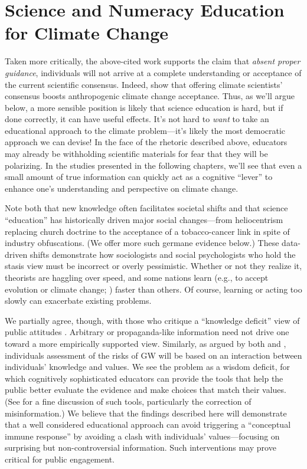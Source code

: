 \section{Science and Numeracy Education for Climate Change}
\label{sec:science-ed}

Taken more critically, the above-cited work supports the claim that \emph{absent
proper guidance}, individuals will not arrive at a complete understanding or
acceptance of the current scientific consensus.  Indeed,
\textcite{lewandowsky_pivotal_2013} show that offering climate scientists'
consensus boosts anthropogenic climate change acceptance.  Thus, as we'll argue
below, a more sensible position is likely that science education is hard, but if
done correctly, it can have useful effects.  It's not hard to \emph{want} to
take an educational approach to the climate problem---it's likely the most
democratic approach we can devise! In the face of the rhetoric described above,
educators may already be withholding scientific materials for fear that they will
be polarizing. In the studies presented in the following chapters, we'll see
that even a small amount of true information can quickly act as a cognitive
``lever'' to enhance one's understanding and perspective on climate change.

Note both that new knowledge often facilitates societal shifts and that science
``education'' has historically driven major social changes—from heliocentrism
replacing church doctrine to the acceptance of a tobacco-cancer link in spite of
industry obfuscations. (We offer more such germane evidence below.) These
data-driven shifts demonstrate how sociologists and social psychologists who
hold the stasis view must be incorrect or overly pessimistic. Whether or not
they realize it, theorists are haggling over speed, and some nations learn
(e.g., to accept evolution or climate change; ) faster than others.
Of course, learning or acting too slowly can exacerbate existing problems.

We partially agree, though, with those who critique a ``knowledge deficit'' view
of public attitudes \parencite[cf.][]{dickson_case_2005}. Arbitrary or
propaganda-like information need not drive one toward a more empirically
supported view. Similarly, as argued by both \textcite{kahan_polarizing_2012}
and \textcite{ranney_why_2012}, individuals assessment of the risks of GW will
be based on an interaction between individuals' knowledge and values. We see the
problem as a wisdom deficit, for which cognitively sophisticated educators can
provide the tools that help the public better evaluate the evidence and make
choices that match their values. (See  for
a fine discussion of such tools, particularly the correction of misinformation.)
We believe that the findings described here will demonstrate that a well
considered educational approach can avoid triggering a “conceptual immune
response” by avoiding a clash with individuals' values---focusing on surprising
but non-controversial information. Such interventions may prove critical for
public engagement.

